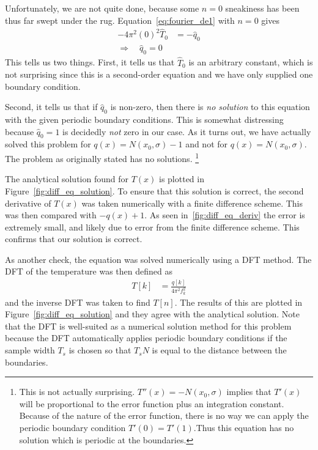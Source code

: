 \documentclass[twocolumn]{myarticle}
\begin{document}
Unfortunately, we are not quite done, because some $ n = 0 $ sneakiness has been thus far swept under the rug.
Equation~\ref{eq:fourier_de1} with $ n = 0 $ gives
\begin{align}
    - 4 \pi^2 (0)^2 \hat{T}_0 &= - \hat{q}_0
    \\
    \Longrightarrow \quad \hat{q}_0 = 0
\end{align}
This tells us two things.
First, it tells us that $ \hat{T}_0 $ is an arbitrary constant, which is not surprising since this is a second-order equation and we have only supplied one boundary condition.

Second, it tells us that if $ \hat{q}_0 $ is non-zero, then there is \emph{no solution} to this equation with the given periodic boundary conditions.
This is somewhat distressing because $ \hat{q}_0 = 1 $ is decidedly \emph{not} zero in our case.
As it turns out, we have actually solved this problem for $ q(x) = N(x_0, \sigma) - 1 $ and not for $ q(x) = N(x_0, \sigma) $.
The problem as originally stated has no solutions.
\footnote{This is not actually surprising. $ T''(x) = - N(x_0, \sigma) $ implies that $ T'(x) $ will be proportional to the error function plus an integration constant. Because of the nature of the error function, there is no way we can apply the periodic boundary condition $ T'(0) = T'(1) $.Thus this equation has no solution which is periodic at the boundaries. }

The analytical solution found for $ T(x) $ is plotted in Figure~\ref{fig:diff_eq_solution}.
To ensure that this solution is correct, the second derivative of $ T(x) $ was taken numerically with a finite difference scheme.
This was then compared with $ -q(x)+1 $.
As seen in~\ref{fig:diff_eq_deriv} the error is extremely small, and likely due to error from the finite difference scheme.
This confirms that our solution is correct.

As another check, the equation was solved numerically using a DFT method.
The DFT of the temperature was then defined as
\begin{align}
    T[k] &= \frac{q[k]}{4 \pi^2 f_k^2}
\end{align}
and the inverse DFT was taken to find $ T[n] $.
The results of this are plotted in Figure~\ref{fig:diff_eq_solution} and they agree with the analytical solution.
Note that the DFT is well-suited as a numerical solution method for this problem because the DFT automatically applies periodic boundary conditions if the sample width $ T_s $ is chosen so that $ T_s N $ is equal to the distance between the boundaries.
\end{document}
